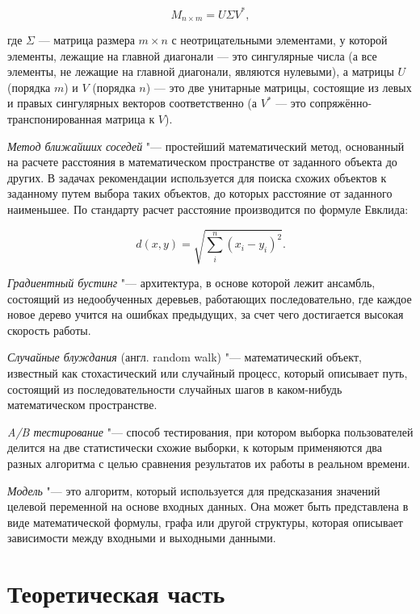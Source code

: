 \documentclass[bachelor, och, coursework]{SCWorks}
\begin{document}
\begin{equation}
    M_{n\times m} = U\Sigma V^*,
\end{equation}

где $\Sigma$  — матрица размера $m\times n$ с неотрицательными элементами, у которой элементы, лежащие на главной диагонали — это сингулярные числа (а все элементы, не лежащие на главной диагонали, являются нулевыми), а матрицы 
$U$ (порядка $m$) и $V$ (порядка $n$) — это две унитарные матрицы, состоящие из левых и правых сингулярных векторов соответственно (а
$V^*$ — это сопряжённо-транспонированная матрица к $V$).

\textit{Метод ближайших соседей} "--- простейший математический метод, основанный на расчете расстояния
в математическом пространстве от заданного объекта до других. В задачах рекомендации используется для поиска
схожих объектов к заданному путем выбора таких объектов, до которых расстояние от заданного наименьшее.
По стандарту расчет расстояние производится по формуле Евклида:

\begin{equation}
    d(x, y) = \sqrt{\sum_i^n (x_i - y_i)^2}.
\end{equation}

\textit{Градиентный бустинг} "--- архитектура, в основе которой лежит ансамбль, состоящий из недообученных деревьев,
работающих последовательно, где каждое новое дерево учится на ошибках предыдущих, за счет чего достигается высокая
скорость работы.

\textit{Случайные блуждания} (англ. random walk) "---  математический объект, известный как стохастический или случайный процесс, который описывает путь, состоящий из последовательности случайных шагов в каком-нибудь математическом пространстве.

\textit{A/B тестирование} "--- способ тестирования, при котором выборка пользователей делится на две статистически
схожие выборки, к которым применяются два разных алгоритма с целью сравнения результатов их работы в реальном времени.

\textit{Модель} "--- это алгоритм, который используется для предсказания значений целевой переменной на основе входных данных.
Она может быть представлена в виде математической формулы, графа или другой структуры, которая описывает зависимости между входными и
выходными данными.

\section{Теоретическая часть}
\end{document}
